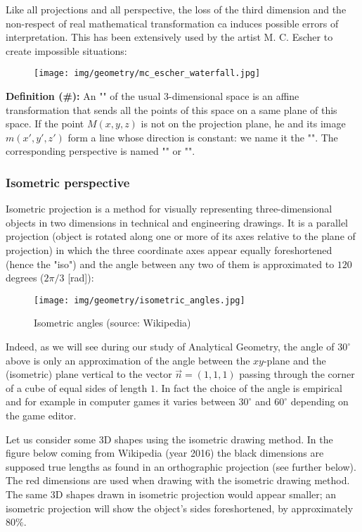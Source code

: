 	Like all projections and all perspective, the loss of the third dimension and the non-respect of real mathematical transformation ca induces possible errors of interpretation. This has been extensively used by the artist M. C. Escher to create impossible situations:
	\begin{figure}[H]
		\centering
		\texttt{[image: img/geometry/mc\_escher\_waterfall.jpg]}
	\end{figure}
	\textbf{Definition (\#\mydef):} An "" of the usual 3-dimensional space is an affine transformation that sends all the points of this space on a same plane of this space. If the point $M (x, y, z)$ is not on the projection plane, he and its image $m (x ', y', z ')$ form a line whose direction is constant: we name it the "". The corresponding perspective is named "" or "".
	
	
	\pagebreak
	\subsubsection{Isometric perspective}
	Isometric projection is a method for visually representing three-dimensional objects in two dimensions in technical and engineering drawings. It is a parallel projection (object is rotated along one or more of its axes relative to the plane of projection) in which the three coordinate axes appear equally foreshortened (hence the "iso") and the angle between any two of them is approximated to $120$ degrees ($2\pi/3$ [rad]):
	\begin{figure}[H]
		\centering
		\texttt{[image: img/geometry/isometric\_angles.jpg]}
		\caption[Isometric angles]{Isometric angles (source: Wikipedia)}
	\end{figure}
	Indeed, as we will see during our study of Analytical Geometry, the angle of $30^\circ$ above is only an approximation of the angle between the $xy$-plane and the (isometric) plane vertical to the vector $\vec{n}=(1,1,1)$ passing through the corner of a cube of equal sides of length $1$. In fact the choice of the angle is empirical and for example in computer games it varies between $30^\circ$ and $60^\circ$ depending on the game editor.
		
	Let us consider some 3D shapes using the isometric drawing method. In the figure below coming from Wikipedia (year 2016) the black dimensions are supposed true lengths as found in an orthographic projection (see further below). The red dimensions are used when drawing with the isometric drawing method. The same 3D shapes drawn in isometric projection would appear smaller; an isometric projection will show the object's sides foreshortened, by approximately $80\%$.
	
